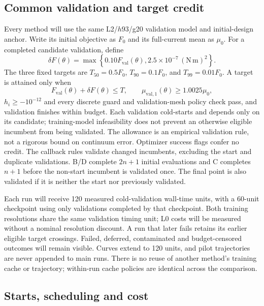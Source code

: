 \subsection{Common validation and target credit}

Every method will use the same L2/$h93$/g20 validation model and initial-design
anchor. Write its initial objective as $F_0$ and its full-current mean as
$\mu_0$. For a completed candidate validation, define
\begin{equation}
 \delta F(\theta)=\max\left\{0.10F_{\mathrm{val}}(\theta),
                    2.5\times10^{-7}\,(\mathrm{N\,m})^2\right\}.
\end{equation}
The three fixed targets are $T_{50}=0.5F_0$, $T_{90}=0.1F_0$, and
$T_{99}=0.01F_0$. A target is attained only when
\begin{equation}
 F_{\mathrm{val}}(\theta)+\delta F(\theta)\leq T,
 \qquad \mu_{\mathrm{val},1}(\theta)\geq1.0025\mu_0,
\end{equation}
$h_i\geq-10^{-12}$ and every discrete guard and validation-mesh policy check pass,
and validation finishes within budget. Each validation cold-starts and
depends only on its candidate; training-model infeasibility does not prevent
an otherwise eligible incumbent from being validated. The allowance is an
empirical validation rule, not
a rigorous bound on continuum error. Optimizer success flags confer no credit.
The callback rules validate changed incumbents, excluding the start and
duplicate validations. B/D complete $2n+1$ initial evaluations and C completes
$n+1$ before the non-start incumbent is validated once. The final point is
also validated if it is neither the start nor previously validated.

Each run will receive 120 measured cold-validation wall-time units, with a
60-unit checkpoint using only validations completed by that checkpoint.
Both training resolutions share the same validation timing unit; L0 costs
will be measured without a nominal resolution discount. A run that later
fails retains its earlier eligible target crossings. Failed, deferred,
contaminated and budget-censored outcomes will remain visible. Curves extend
to 120 units, and pilot trajectories are never appended to main runs.
There is no reuse of another method's training cache or trajectory; within-run
cache policies are identical across the comparison.

\subsection{Starts, scheduling and cost}

